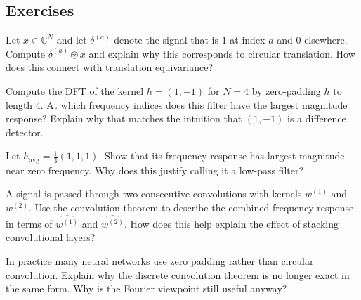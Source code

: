 

\subsection*{Exercises}

\begin{exercise}
Let $x \in \mathbb{C}^N$ and let $\delta^{(a)}$ denote the signal that is $1$ at index $a$ and $0$ elsewhere.
Compute $\delta^{(a)} \circledast x$ and explain why this corresponds to circular translation.
How does this connect with translation equivariance?
\end{exercise}

\begin{exercise}
Compute the DFT of the kernel $h=(1,-1)$ for $N=4$ by zero-padding $h$ to length $4$.
At which frequency indices does this filter have the largest magnitude response?
Explain why that matches the intuition that $(1,-1)$ is a difference detector.
\end{exercise}

\begin{exercise}
Let $h_{\mathrm{avg}} = \frac{1}{3}(1,1,1)$.
Show that its frequency response has largest magnitude near zero frequency.
Why does this justify calling it a low-pass filter?
\end{exercise}

\begin{exercise}
A signal is passed through two consecutive convolutions with kernels $w^{(1)}$ and $w^{(2)}$.
Use the convolution theorem to describe the combined frequency response in terms of $\widehat{w^{(1)}}$ and $\widehat{w^{(2)}}$.
How does this help explain the effect of stacking convolutional layers?
\end{exercise}

\begin{exercise}
In practice many neural networks use zero padding rather than circular convolution.
Explain why the discrete convolution theorem is no longer exact in the same form.
Why is the Fourier viewpoint still useful anyway?
\end{exercise}

